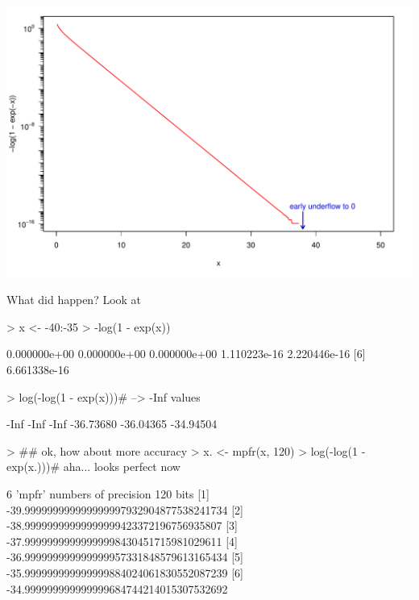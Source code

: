 \begin{frame}[fragile]
\includegraphics{log1exp-log1-exp-log-niceer}
\end{frame}

\begin{frame}[fragile]
What did happen?  Look at
\begin{Schunk}
\begin{Sinput}
> x <- -40:-35
>     -log(1 - exp(x))
\end{Sinput}
\begin{Soutput}
[1] 0.000000e+00 0.000000e+00 0.000000e+00 1.110223e-16 2.220446e-16
[6] 6.661338e-16
\end{Soutput}
\begin{Sinput}
> log(-log(1 - exp(x)))# --> -Inf values
\end{Sinput}
\begin{Soutput}
[1]      -Inf      -Inf      -Inf -36.73680 -36.04365 -34.94504
\end{Soutput}
\begin{Sinput}
> ## ok, how about more accuracy
> x. <- mpfr(x, 120)
> log(-log(1 - exp(x.)))# aha... looks perfect now
\end{Sinput}
\begin{Soutput}
6 'mpfr' numbers of precision  120   bits 
[1] -39.999999999999999997932904877538241734
[2]  -38.99999999999999999423372196756935807
[3]  -37.99999999999999998430451715981029611
[4] -36.999999999999999957331848579613165434
[5] -35.999999999999999884024061830552087239
[6] -34.999999999999999684744214015307532692
\end{Soutput}
\end{Schunk}
\end{frame}

